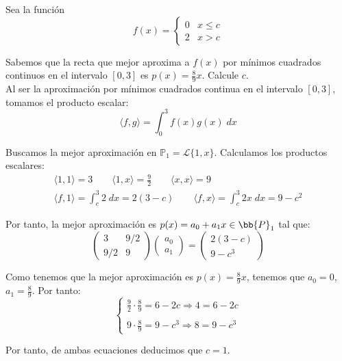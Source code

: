 \documentclass[12pt]{article}
\begin{document}
\begin{ejercicio} 
    Sea la función
    \begin{equation*}
        f(x)=\left\{\begin{array}{cc}
            0 & x\leq c \\
            2 & x>c
        \end{array}\right.
    \end{equation*}

    Sabemos que la recta que mejor aproxima a $f(x)$ por mínimos cuadrados continuos en el intervalo $[0, 3]$ es $\displaystyle p(x) = \frac{8}{9}x$. Calcule $c$.\\

    Al ser la aproximación por mínimos cuadrados continua en el intervalo $[0,3]$, tomamos el producto escalar:
    \begin{equation*}
        \langle f,g\rangle = \int_0^3 f(x)g(x)\;dx
    \end{equation*}

    Buscamos la mejor aproximación en $\mathbb{P}_1=\mathcal{L}\{1,x\}$. Calculamos los productos escalares:
    \begin{gather*}
        \langle 1,1\rangle = 3
        \qquad
        \langle 1,x\rangle = \frac{9}{2}
        \qquad
        \langle x,x\rangle = 9
        \\
        \langle f,1\rangle = \int_c^3 2\;dx = 2(3-c)
        \qquad
        \langle f,x\rangle = \int_c^3 2x\;dx = 9-c^2 
    \end{gather*}

    Por tanto, la mejor aproximación es $p(x)=a_0+a_1x \in \bb{P}_1$ tal que:
    \begin{equation*}
        \left(\begin{array}{cc}
            3 & 9/2 \\
            9/2 & 9
        \end{array}\right)
        \left(\begin{array}{c}
            a_0 \\ a_1    
        \end{array}\right)
        = 
        \left(\begin{array}{c}
            2(3-c) \\ 9-c^3
        \end{array}\right)
    \end{equation*}

    Como tenemos que la mejor aproximación es $p(x)=\frac{8}{9}x$, tenemos que $a_0=0$, $a_1=\frac{8}{9}$. Por tanto:
    \begin{equation*}
        \left\{\begin{array}{c}
            \displaystyle \frac{9}{2}\cdot \frac{8}{9} = 6-2c \Longrightarrow 4 = 6-2c  \\
            \\
            \displaystyle 9\cdot \frac{8}{9} = 9-c^3 \Longrightarrow 8=9-c^3
        \end{array}\right.
    \end{equation*}

    Por tanto, de ambas ecuaciones deducimos que $c=1$.
\end{ejercicio}
\end{document}
